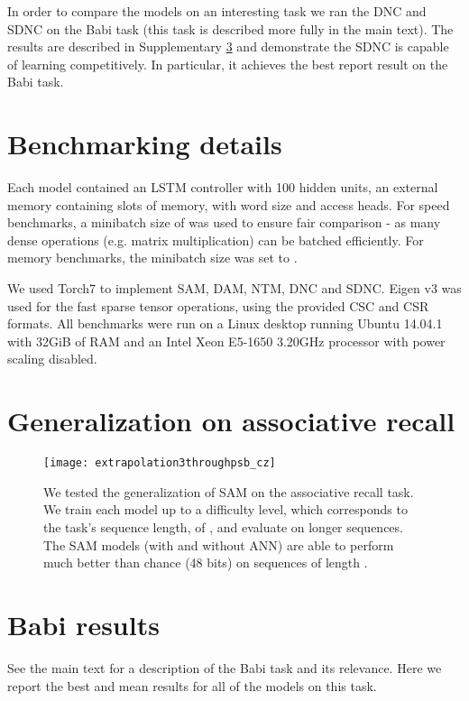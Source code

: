 \documentclass{article}
\begin{document}
In order to compare the models on an interesting task we ran the DNC and SDNC on the Babi task (this task is described more fully in the main text). The results are described in Supplementary \ref{sec:babi} and demonstrate the SDNC is capable of learning competitively. In particular, it achieves the best report result on the Babi task.


\section{Benchmarking details}
\label{sec:benchmarking}

Each model contained an LSTM controller with 100 hidden units, an external memory containing  slots of memory, with word size  and  access heads. For speed benchmarks, a minibatch size of  was used to ensure fair comparison - as many dense operations (e.g. matrix multiplication) can be batched efficiently. For memory benchmarks, the minibatch size was set to .

We used Torch7 \cite{collobert2011torch7} to implement SAM, DAM, NTM, DNC and SDNC. Eigen v3 \cite{guennebaud2010eigen} was used for the fast sparse tensor operations, using the provided CSC and CSR formats. All benchmarks were run on a Linux desktop running Ubuntu 14.04.1 with 32GiB of RAM and an Intel Xeon E5-1650 3.20GHz processor with power scaling disabled.

\section{Generalization on associative recall}

\begin{figure}[h!]
    \centering
\texttt{[image: extrapolation3throughpsb\_cz]}
    \caption{We tested the generalization of SAM on the associative recall task. We train each model up to a difficulty level, which corresponds to the task's sequence length, of , and evaluate on longer sequences. The SAM models (with and without ANN) are able to perform much better than chance (48 bits) on sequences of length .
    }
    \label{fig:extrapolation}
\end{figure}

\section{Babi results}
\label{sec:babi}

See the main text for a description of the Babi task and its relevance. Here we report the best and mean results for all of the models on this task.
\end{document}
